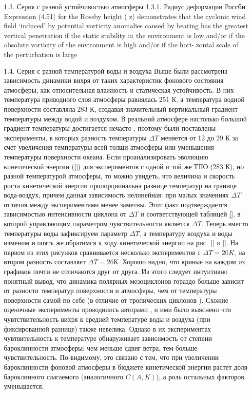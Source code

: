 1.3.	Серия с разной устойчивостью атмосферы
1.3.1.	Радиус деформации Россби
Expression (4.51) for the Rossby height ( z) demonstrates that the cyclonic
wind field ‘induced’ by potential vorticity anomalies caused by heating has the
greatest vertical penetration if the static stability in the environment is low
and/or if the absolute vorticity of the environment is high and/or if the hori-
zontal scale of the perturbation is large


1.4.	Серия с разной температурой воды и воздуха
Выше были рассмотрена зависимость динамики вихря от таких характеристик фонового состояния атмосферы, как относительная влажность и статическая устойчивость. В них температура приводного слоя атмосферы равнялась 251 К, а температура водной поверхности составляла 283 К, создавая значительный вертикальный градиент температуры между водой и воздухом. В реальной атмосфере настолько большой градиент температуры достигается нечасто \cite{ForbesLottes1985}, поэтому были поставлены эксперименты, в которых разность температуры $\Delta T$ меняется от 12 до 29 К за счет увеличения температуры всей толщи атмосферы или уменьшения температуры поверхности океана. 
Если проанализировать эволюцию кинетической энергии (\ref{}) для экспериментов с одной и той же ТПО (283 К), но разной температурой атмосферы, то можно увидеть, что величина и скорость роста кинетической энергии пропорциональна разнице температур на границе вода-воздух, причем данная зависимость нелинейная: при малых значениях $\Delta T$ отличия между экспериментами менее заметны. Этот факт подтверждается зависимостью интенсивности циклона от $\Delta T$ и соответствующей таблицей \ref{}, в которой управляющим параметром чувствительности является $\Delta T$. 
Теперь вместо температуры воды зафиксируем параметр $\Delta T$, а температуру воздуха и воды изменим и опять же обратимся к ходу кинетической энергии на рис. \ref{} и \ref{}. На первом из этих рисунков сравнивается несколько экспериментов с $\Delta T=20 K$, на втором разность составляет $\Delta T=26 К$. Хорошо видно, что кривые на каждом из графиков почти не отличаются друг от друга. Из этого следует интуитивно понятный вывод, что динамика полярных мезоциклонов гораздо больше зависит от разности температур поверхности и атмосферы, чем от температуры поверхности самой по себе (в отличие от тропических циклонов \cite{EmanuelRotunno1989,Глебова_диссер}). Схожие оценочные эксперименты проводились авторами \cite{YanaseNiino2007}, и ими было выяснено что чувтствительность вихря к средней температуре воды и воздуха (при фиксированной разнице) также невелика. Однако в их экспериментах чувтвительность к температуре обнаруживает зависимость от степени бароклинности атмосферы: чем меньше сдвиг ветра, тем больше чувствительность. По-видимому, это связано с тем, что при увеличении бароклинности фоновой атмосферы в бюджете кинетической энергии растет доля бароклинного слагаемого (аналогичного $C(A,K)$), а роль остальных факторов уменьшается.

